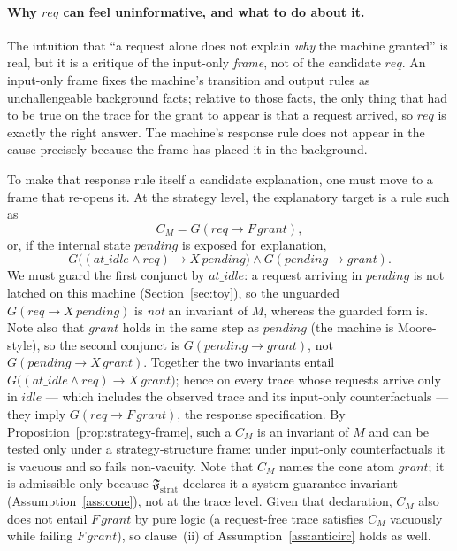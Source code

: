 \documentclass[11pt]{article}
\theoremstyle{remark}
\newcommand{\Frame}{\mathfrak{F}}
\begin{document}
\paragraph{Why \(req\) can feel uninformative, and what to do about it.}
The intuition that ``a request alone does not explain \emph{why} the machine
granted'' is real, but it is a critique of the input-only \emph{frame}, not of
the candidate \(req\). An input-only frame fixes the machine's transition and
output rules as unchallengeable background facts; relative to those facts, the
only thing that had to be true on the trace for the grant to appear is that a
request arrived, so \(req\) is exactly the right answer. The machine's response
rule does not appear in the cause precisely because the frame has placed it in
the background.

To make that response rule itself a candidate explanation, one must move to a
frame that re-opens it. At the strategy level, the explanatory target is a rule
such as
\[
  C_M = G(req\rightarrow F\,grant),
\]
or, if the internal state \(pending\) is exposed for explanation,
\[
  G\bigl((\mathit{at\_idle}\land req)\rightarrow X\,pending\bigr)
  \land
  G(pending\rightarrow grant).
\]
We must guard the first conjunct by \(\mathit{at\_idle}\): a request arriving in
\(pending\) is not latched on this machine (Section~\ref{sec:toy}), so the
unguarded \(G(req\rightarrow X\,pending)\) is \emph{not} an invariant of \(M\),
whereas the guarded form is. Note also that \(grant\) holds in the same step as
\(pending\) (the machine is Moore-style), so the second conjunct is
\(G(pending\rightarrow grant)\), not \(G(pending\rightarrow X\,grant)\). Together
the two invariants entail
\(G\bigl((\mathit{at\_idle}\land req)\rightarrow X\,grant\bigr)\); hence on every
trace whose requests arrive only in \(idle\) --- which includes the observed
trace and its input-only counterfactuals --- they imply
\(G(req\rightarrow F\,grant)\), the response specification. By
Proposition~\ref{prop:strategy-frame}, such a \(C_M\) is an invariant of \(M\)
and can be tested only under a strategy-structure frame: under input-only
counterfactuals it is vacuous and so fails non-vacuity. Note that \(C_M\) names
the cone atom \(grant\); it is admissible only because \(\Frame_{\mathrm{strat}}\)
declares it a system-guarantee invariant (Assumption~\ref{ass:cone}), not at the
trace level. Given that declaration, \(C_M\) also does not entail \(F\,grant\) by
pure logic (a request-free trace satisfies \(C_M\) vacuously while failing
\(F\,grant\)), so clause~(ii) of Assumption~\ref{ass:anticirc} holds as well.
\end{document}

